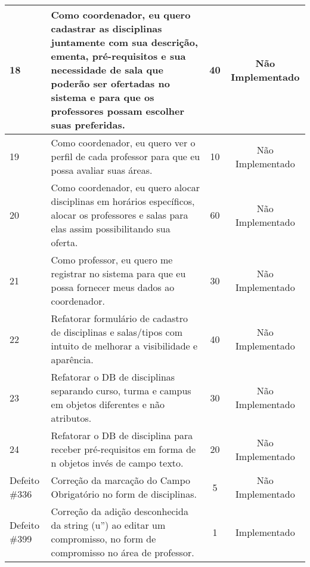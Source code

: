 \begin{landscape}
\begin{longtable}{|p{0.5in}|p{6in}|c|c|}
		\hline \rowcolor{cNaoImplementado}
		        18 & Como coordenador, eu quero cadastrar as disciplinas juntamente com sua descrição, ementa, pré-requisitos e sua necessidade de sala que poderão ser ofertadas no sistema e para que os professores possam escolher suas preferidas. &         40 & Não Implementado \\
		
		\hline \rowcolor{cNaoImplementado}
		        19 & Como coordenador, eu quero ver o perfil de cada professor para que eu possa avaliar suas áreas.  &         10 & Não Implementado \\
		
		\hline \rowcolor{cNaoImplementado}
		        20 & Como coordenador, eu quero alocar disciplinas em horários específicos, alocar os professores e salas para elas assim possibilitando sua oferta.  &         60 & Não Implementado \\
		
		\hline \rowcolor{cNaoImplementado}
		        21 & Como professor, eu quero me registrar no sistema para que eu possa fornecer meus dados ao coordenador. &         30 & Não Implementado \\
		
		\hline \rowcolor{cNaoImplementado}
		        22 & Refatorar formulário de cadastro de disciplinas e salas/tipos com intuito de melhorar a visibilidade e aparência.  &         40 & Não Implementado \\
		
		\hline \rowcolor{cNaoImplementado}
		        23 & Refatorar o DB de disciplinas separando curso, turma e campus em objetos diferentes e não atributos. &         30 & Não Implementado \\
		
		\hline \rowcolor{cNaoImplementado}
		        24 & Refatorar o DB de disciplina para receber pré-requisitos em forma de n objetos invés de campo texto. &         20 & Não Implementado \\
		
		\hline \rowcolor{cNaoImplementado}
				Defeito \#336 & Correção da marcação do Campo Obrigatório no form de disciplinas.  &          5 & Não Implementado \\
		
		\hline \rowcolor{cImplementado}
				Defeito \#399  & Correção da adição desconhecida da string (u'') ao editar um compromisso, no form de compromisso no área de professor. &          1 & Implementado \\
		

\end{longtable}
\end{landscape}
